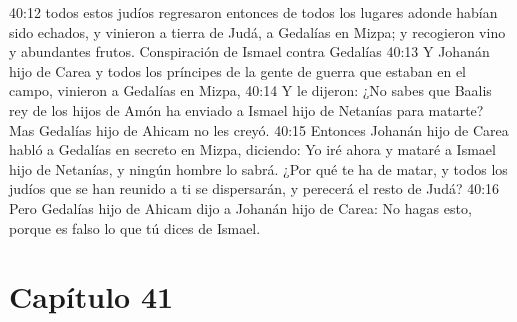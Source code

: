 40:12 todos estos judíos regresaron entonces de todos los lugares adonde habían sido echados, y vinieron a tierra de Judá, a Gedalías en Mizpa; y recogieron vino y abundantes frutos. 
Conspiración de Ismael contra Gedalías 
40:13 Y Johanán hijo de Carea y todos los príncipes de la gente de guerra que estaban en el campo, vinieron a Gedalías en Mizpa, 
40:14 Y le dijeron: ¿No sabes que Baalis rey de los hijos de Amón ha enviado a Ismael hijo de Netanías para matarte? Mas Gedalías hijo de Ahicam no les creyó. 
40:15 Entonces Johanán hijo de Carea habló a Gedalías en secreto en Mizpa, diciendo: Yo iré ahora y mataré a Ismael hijo de Netanías, y ningún hombre lo sabrá. ¿Por qué te ha de matar, y todos los judíos que se han reunido a ti se dispersarán, y perecerá el resto de Judá? 
40:16 Pero Gedalías hijo de Ahicam dijo a Johanán hijo de Carea: No hagas esto, porque es falso lo que tú dices de Ismael. 
\section*{Capítulo 41 }
 
